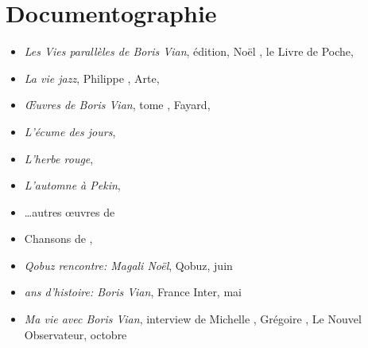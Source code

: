 \chapter{Documentographie}

\begin{itemize}
\item \emph{Les Vies parallèles de Boris Vian},  édition,
Noël , le Livre de Poche, 
\item \emph{La vie jazz}, Philippe , Arte, 
\item \emph{\OE{}uvres de Boris Vian}, tome , Fayard,  
\item \emph{L'écume des jours}, \BV
\item \emph{L'herbe rouge}, \BV
\item \emph{L'automne à Pekin}, \BV
\item \ldots autres \oe{}uvres de \BV
\item Chansons de \BV,
\item \emph{Qobuz rencontre: Magali Noël}, Qobuz,  juin 
\item \emph{ ans d'histoire: Boris Vian}, France Inter,  mai 
\item \emph{Ma vie avec Boris Vian}, interview de Michelle , Grégoire , Le Nouvel Observateur,  octobre 
\end{itemize}

